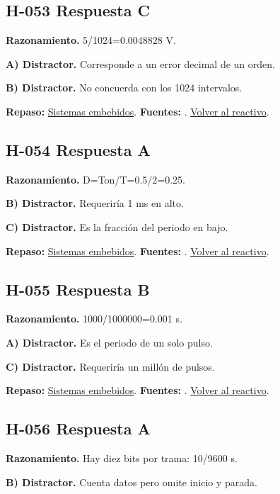 \subsection*{H-053 \quad Respuesta C}\label{s:H-053}
\textbf{Razonamiento.} 5/1024=0.0048828 V.

\textbf{A) Distractor. }Corresponde a un error decimal de un orden.

\textbf{B) Distractor. }No concuerda con los 1024 intervalos.

\textbf{Repaso:} \hyperref[sec:h3]{Sistemas embebidos}. \textbf{Fuentes:} \cite{avr,arduino,sensors}. \hyperref[q:H-053]{Volver al reactivo}.\par\medskip

\subsection*{H-054 \quad Respuesta A}\label{s:H-054}
\textbf{Razonamiento.} D=Ton/T=0.5/2=0.25.

\textbf{B) Distractor. }Requeriría 1 ms en alto.

\textbf{C) Distractor. }Es la fracción del periodo en bajo.

\textbf{Repaso:} \hyperref[sec:h3]{Sistemas embebidos}. \textbf{Fuentes:} \cite{avr,arduino,sensors}. \hyperref[q:H-054]{Volver al reactivo}.\par\medskip

\subsection*{H-055 \quad Respuesta B}\label{s:H-055}
\textbf{Razonamiento.} 1000/1000000=0.001 s.

\textbf{A) Distractor. }Es el periodo de un solo pulso.

\textbf{C) Distractor. }Requeriría un millón de pulsos.

\textbf{Repaso:} \hyperref[sec:h3]{Sistemas embebidos}. \textbf{Fuentes:} \cite{avr,arduino,sensors}. \hyperref[q:H-055]{Volver al reactivo}.\par\medskip

\subsection*{H-056 \quad Respuesta A}\label{s:H-056}
\textbf{Razonamiento.} Hay diez bits por trama: 10/9600 s.

\textbf{B) Distractor. }Cuenta datos pero omite inicio y parada.

